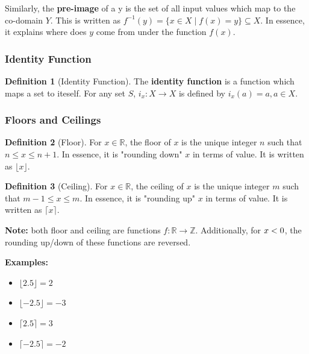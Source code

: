 \documentclass[12pt]{article}
\newcommand{\lt}{\ensuremath <}
\newcommand{\Z}{\mathbb{Z}}
\newcommand{\R}{\mathbb{R}}
\theoremstyle{definition}
\newtheorem{definition}{Definition}
\begin{document}
    Similarly, the \textbf{pre-image} of a y is the set of all input values which
    map to the co-domain $Y$. This is written as 
    $f^{-1}(y)=\{x\in X \mid f(x) = y\} \subseteq X$. In essence, it explains where
    does $y$ come from under the function $f(x)$.

    \subsubsection{Identity Function}
    \begin{definition}[Identity Function]
        \label{def:identity-function}
        The \textbf{identity function} is a function which maps a set to iteself. For any set $S$,
        $i_x:X \to X$ is defined by $i_x(a) = a, a \in X$.       
    \end{definition}

    \subsubsection{Floors and Ceilings}
    \begin{definition}[Floor]
        \label{def:floor}
        For $x \in \R$, the floor of $x$ is the unique integer $n$ such that $n \le x \le n+1$.
        In essence, it is "rounding down" $x$ in terms of value. It is written as $\lfloor x \rfloor$. \\
    \end{definition}

    \begin{definition}[Ceiling]
        \label{def:ceiling}
        For $x \in \R$, the ceiling of $x$ is the unique integer $m$ such that $m-1 \le x \le m$.
        In essence, it is "rounding up" $x$ in terms of value. It is written as $\lceil x \rceil$.
    \end{definition}

    \textbf{Note: } both floor and ceiling are functions $f: \R \to \Z$. 
    Additionally, for $x \lt 0$, the rounding up/down of these functions are reversed.

    \textbf{Examples:}
    \begin{itemize}
        \item $\lfloor 2.5 \rfloor = 2$
        \item $\lfloor -2.5 \rfloor = -3$
        \item $\lceil 2.5 \rceil = 3$
        \item $\lceil -2.5 \rceil = -2$
    \end{itemize}
\end{document}
